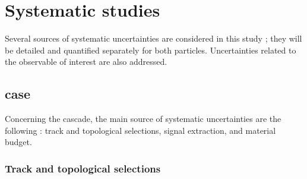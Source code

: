 \section{Systematic studies}
\label{sec:Section05}

Several sources of systematic uncertainties are considered in this study ; they will be detailed and quantified separately for both particles. Uncertainties related to the observable of interest are also addressed.

\subsection{\rmOmega case}
\label{sec:Section05.a-}

Concerning the cascade, the main source of systematic uncertainties are the following : track and topological selections, signal extraction, and material budget.

\subsubsection{Track and topological selections}

